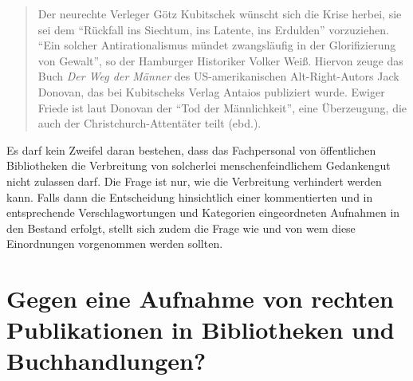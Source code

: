 \documentclass[a4paper,
fontsize=11pt,
oneside,
numbers=noperiodatend,
parskip=half-,
bibliography=totoc,
final
]{scrartcl}
\begin{document}
\begin{quote}
Der neurechte Verleger Götz Kubitschek wünscht sich die Krise herbei,
sie sei dem \enquote{Rückfall ins Siechtum, ins Latente, ins Erdulden}
vorzuziehen. \enquote{Ein solcher Antirationalismus mündet zwangsläufig
in der Glorifizierung von Gewalt}, so der Hamburger Historiker Volker
Weiß. Hiervon zeuge das Buch \emph{Der Weg der Männer} des
US-amerikanischen Alt-Right-Autors Jack Donovan, das bei Kubitscheks
Verlag Antaios publiziert wurde. Ewiger Friede ist laut Donovan der
\enquote{Tod der Männlichkeit}, eine Überzeugung, die auch der
Christchurch-Attentäter teilt (ebd.).
\end{quote}

Es darf kein Zweifel daran bestehen, dass das Fachpersonal von
öffentlichen Bibliotheken die Verbreitung von solcherlei
menschenfeindlichem Gedankengut nicht zulassen darf. Die Frage ist nur,
wie die Verbreitung verhindert werden kann. Falls dann die Entscheidung
hinsichtlich einer kommentierten und in entsprechende Verschlagwortungen
und Kategorien eingeordneten Aufnahmen in den Bestand erfolgt, stellt
sich zudem die Frage wie und von wem diese Einordnungen vorgenommen
werden sollten.

\hypertarget{gegen-eine-aufnahme-von-rechten-publikationen-in-bibliotheken-und-buchhandlungen}{%
\section*{Gegen eine Aufnahme von rechten Publikationen in
Bibliotheken und
Buchhandlungen?}\label{gegen-eine-aufnahme-von-rechten-publikationen-in-bibliotheken-und-buchhandlungen}}
\end{document}
